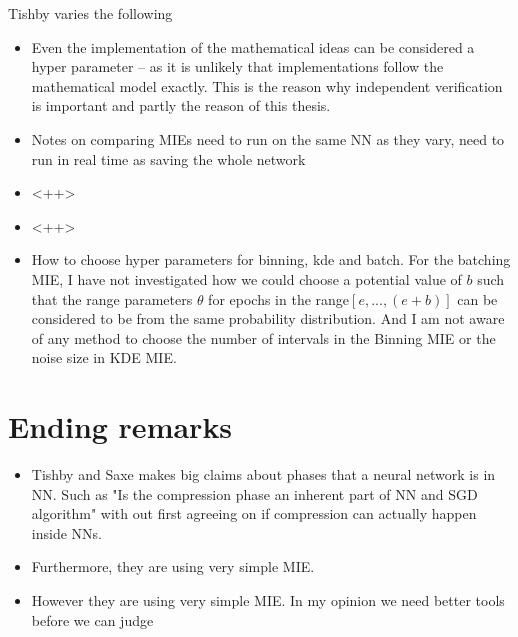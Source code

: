 \documentclass[dissertation.tex]{subfiles}
\begin{document}
Tishby varies the following 
\begin{itemize}
  \item{
      Even the implementation of the mathematical ideas can be considered a
      hyper parameter -- as it is unlikely that implementations follow the
      mathematical model exactly. This is the reason why independent
      verification is important and partly the reason of this thesis.
    }
  \item{
      Notes on comparing MIEs need to run on the same NN as they vary, need to
      run in real time as saving the whole network
    }
  \item{
      <++>
    }
  \item{
      <++>
    }
  \item{
      How to choose hyper parameters for binning, kde and batch. For the
      batching MIE, I have not
      investigated how we could choose a potential value of $b$ such that the
      range parameters $\theta$ for epochs in the range$[e,...,(e+b)]$ can be
      considered to be from the same probability distribution. And I am not
      aware of any method to choose the number of intervals in the Binning MIE
      or the noise size in KDE MIE.
    }
\end{itemize}

\section{Ending remarks}
 
\begin{itemize}
  \item{
      Tishby and Saxe makes big claims about phases that a neural network is in
      NN. Such as "Is the compression phase an inherent part of NN and SGD
      algorithm" with out first agreeing on if compression can actually happen
      inside NNs.
    }
  \item{
      Furthermore, they are using very simple MIE.
    }
  \item{
      However they are using very simple MIE. In my opinion we need better tools
      before we can judge 
    }
\end{itemize}
\end{document}
